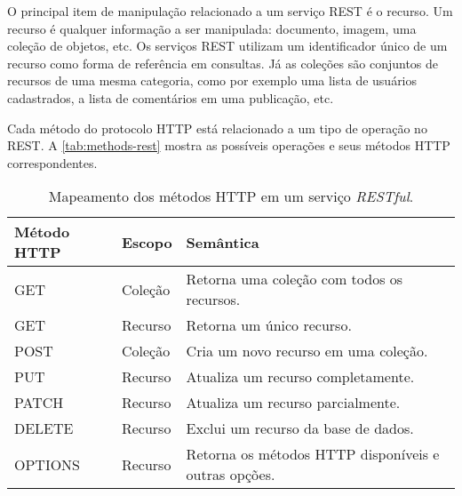 O principal item de manipulação relacionado a um serviço REST é o recurso. Um recurso é qualquer informação a ser manipulada: documento, imagem, uma coleção de objetos, etc. Os serviços REST utilizam um identificador único de um recurso como forma de referência em consultas. Já as coleções são conjuntos de recursos de uma mesma categoria, como por exemplo uma  lista de usuários cadastrados, a lista de comentários em uma publicação, etc.

Cada método do protocolo HTTP está relacionado a um tipo de operação no REST. A \autoref{tab:methods-rest} mostra as possíveis operações e seus métodos HTTP correspondentes.

\begin{table}[htb]
	\centering
	\caption{Mapeamento dos métodos HTTP em um serviço \textit{RESTful}.}
	\label{tab:methods-rest}
	\begin{tabular}{p{3.5cm}p{2cm}p{9cm}}
		\hline
		\textbf{Método HTTP} &
		\textbf{Escopo}      &
		\textbf{Semântica}                                   \\[5mm]

		\hline
		GET                  &
		Coleção              &
		Retorna uma coleção com todos os recursos.           \\[5mm]

		\hline
		GET                  &
		Recurso              &
		Retorna um único recurso.                            \\[5mm]

		\hline
		POST                 &
		Coleção              &
		Cria um novo recurso em uma coleção.                 \\[5mm]

		\hline
		PUT                  &
		Recurso              &
		Atualiza um recurso completamente.                   \\[5mm]

		\hline
		PATCH                &
		Recurso              &
		Atualiza um recurso parcialmente.                    \\[5mm]

		\hline
		DELETE               &
		Recurso              &
		Exclui um recurso da base de dados.                  \\[5mm]

		\hline
		OPTIONS              &
		Recurso              &
		Retorna os métodos HTTP disponíveis e outras opções. \\[5mm]

		\hline
	\end{tabular}
\end{table}

